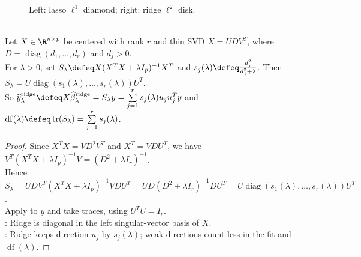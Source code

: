 \begin{figure}[H]
\centering

\caption{Left: lasso $\ell^1$ diamond; right: ridge $\ell^2$ disk.}
\label{fig:sl-ridge-lasso-constraint-geometry}
\end{figure}

\begin{proposition} \label{prop:sl-ridge-effective-degrees} \\
Let $X\in\R^{n\times p}$ be centered with rank $r$ and thin SVD $X=UDV^T$, where $D=\operatorname{diag}(d_1,\ldots,d_r)$ and $d_j>0$.\\
For $\lambda>0$, set $S_\lambda\defeq X(X^TX+\lambda I_p)^{-1}X^T$ and $s_j(\lambda)\defeq \frac{d_j^2}{d_j^2+\lambda}$. Then $S_\lambda=U\operatorname{diag}(s_1(\lambda),\ldots,s_r(\lambda))U^T$.\\
So $\widehat{y}^{\mathrm{ridge}}_\lambda\defeq X\widehat{\beta}^{\mathrm{ridge}}_\lambda=S_\lambda y=\sum\limits_{j=1}^r s_j(\lambda)u_ju_j^Ty$ and $\operatorname{df}(\lambda)\defeq\operatorname{tr}(S_\lambda)=\sum\limits_{j=1}^r s_j(\lambda)$.
\begin{proof} Since $X^TX=VD^2V^T$ and $X^T=VDU^T$, we have $V^T(X^TX+\lambda I_p)^{-1}V=(D^2+\lambda I_r)^{-1}$.\\
Hence $S_\lambda=UDV^T(X^TX+\lambda I_p)^{-1}VDU^T=UD(D^2+\lambda I_r)^{-1}DU^T=U\operatorname{diag}(s_1(\lambda),\ldots,s_r(\lambda))U^T$.\\
Apply to $y$ and take traces, using $U^TU=I_r$.\\
: Ridge is diagonal in the left singular-vector basis of $X$.\\
: Ridge keeps direction $u_j$ by $s_j(\lambda)$; weak directions count less in the fit and $\operatorname{df}(\lambda)$.
\end{proof}
\end{proposition}
